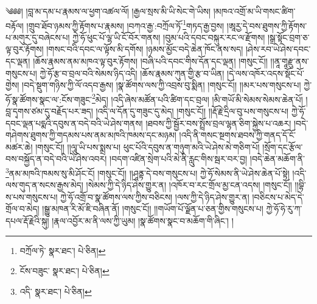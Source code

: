 \setcounter{footnote}{0} 
༄༅༅། །བླ་མ་དམ་པ་རྣམས་ལ་ཕྱག་འཚལ་ལོ། །རྒྱལ་སྲས་མི་ཡི་སེང་གེ་ཡིས། །མཁའ་འགྲོ་མ་ཡི་གསང་ཚིག་བརྟོལ། །གྲུབ་ཐོབ་ཉམས་ཀྱི་རྟོགས་པ་རྣམས། །བཀའ་རྒྱ་:བཀྲོལ་ཏོ་\footnote{བཀྲོལ་ཏེ་  སྣར་ཐང་།  པེ་ཅིན། }གཏད་རྒྱ་བྱས། །ཨཱརྱ་དེ་བས་ཐུགས་ཀྱི་རྟོགས་པ་མགུར་དུ་བཞེངས་པ། ཀྱེ་ཧོ་ཕུང་པོ་ལྷ་ཡི་ངོ་བོར་གནས། །བུམ་པའི་དབང་བསྐུར་རང་ལ་རྫོགས། །སྒྲ་སྟོང་བྲག་ཅ་ལྟ་བུར་རྟོགས། །གསང་བའི་དབང་ལ་ལྟོས་མི་དགོས། །ཉམས་མྱོང་བདེ་ཆེན་ཁོང་ནས་སད། །ཤེས་རབ་ཡེ་ཤེས་དབང་དང་ལྡན། །ཆོས་རྣམས་ནམ་མཁའ་ལྟ་བུར་རྟོགས། །བཞི་པའི་དབང་གིས་དོན་དང་ལྡན། །གསུང་ངོ།། །།ནཱ་གཱརྫུ་ནས་གསུངས་པ། ཀྱེ་ཧོ་རྩ་བ་བྲལ་བའི་སེམས་ཉིད་འདི། །ཆོས་རྣམས་ཀུན་གྱི་རྩ་བ་ཡིན། །དེ་ལས་འཁོར་འདས་སྡོང་པོ་གྱེས། །བདེ་སྡུག་གཉིས་ཀྱི་ལོ་འདབ་རྒྱས། །སྣ་ཚོགས་ལས་ཀྱི་འབྲས་བུ་སྨིན། །གསུང་ངོ།། །།མར་པས་གསུངས་པ། ཀྱེ་ཧོ་སྣ་ཚོགས་སྣང་ལ་:ངོས་གཟུང་\footnote{ངོས་བཟུང་  སྣར་ཐང་།  པེ་ཅིན། }མེད། །འདི་ཞེས་མཚོན་པའི་ཚིག་དང་བྲལ། །མི་གཡོ་མི་སེམས་སེམས་ཆེན་པོ། །བླ་དྭགས་ཙམ་དུ་བརྗོད་པར་ཟད། །འདི་ལ་དོན་དུ་གཟུང་དུ་མེད། །གསུང་ངོ།། །།རྡོ་རྗེ་དྲིལ་བུ་པས་གསུངས་པ། ཀྱེ་ཧོ་དབང་ལྡན་པདྨའི་དབུས་ན་བདེ་བའི་ཡེ་ཤེས་གནས། །ཐབས་ཀྱི་སྦྱོར་བས་སྤྲོས་བྲལ་ལྷན་ཅིག་སྐྱེས་པ་འཆར། །བདེ་གཤེགས་ཐུགས་ཀྱི་གདམས་པས་ནམ་མཁའི་ཁམས་དང་མཉམ། །འདི་ནི་གསང་སྔགས་ཐབས་ཀྱི་གནད་དོ་ངོ་མཚར་ཆེ། །གསུང་ངོ།། །།ལཱུ་ཡི་པས་སྨྲས་པ། ཕུང་པོའི་དབུས་ན་གཉུག་མའི་ཡེ་ཤེས་མེ་གཅིག་པོ། །སྲོག་དང་རྩོལ་བས་བསྐྱོད་ན་བདེ་བའི་ཡེ་ཤེས་འབར། །བདག་འཛིན་སྲེག་པའི་མེ་ནི་རླུང་གིས་སྦར་བར་བྱ། །བདེ་ཆེན་མཆོག་ནི་\footnote{འདི་  སྣར་ཐང་།  པེ་ཅིན། }ནམ་མཁའི་ཁམས་སུ་མི་ཤོང་ངོ། །གསུང་ངོ།། །།ཤཱནྟ་དེ་བས་གསུངས་པ། ཀྱེ་ཧོ་སེམས་ནི་ཡེ་ཤེས་ཆེན་པོ་སྟེ། །འདི་ལས་གུད་ན་སངས་རྒྱས་མེད། །སེམས་ཀྱི་དེ་ཉིད་ཤེས་གྱུར་ན། །འཁོར་བ་རང་གྲོལ་མྱ་ངན་འདས། །གསུང་ངོ།། །།བྷི་ས་པས་གསུངས་པ། ཀྱེ་ཧོ་འགྲོ་བ་སྣ་ཚོགས་ལས་ཀྱིས་བཅིངས། །ལས་ཀྱི་དེ་ཉིད་ཤེས་གྱུར་ན། །བཅིངས་པ་མེད་དེ་གྲོལ་བ་མེད། །སྒྱུ་མཁན་རི་མོ་ཇི་བཞིན་ནོ། །གསུང་ངོ།། །།གཡོག་པོ་ལྗོན་པ་ཅན་གྱིས་གསུངས་པ། ཀྱེ་ཧོ་ཧེ་རུ་ཀ་དཔལ་རྡོ་རྗེའི་སྐུ། །རྣལ་འབྱོར་མ་ནི་ལས་ཀྱི་ཡུམ། །སྣ་ཚོགས་སྣང་བ་མཆོག་གི་ཞིང་། །

